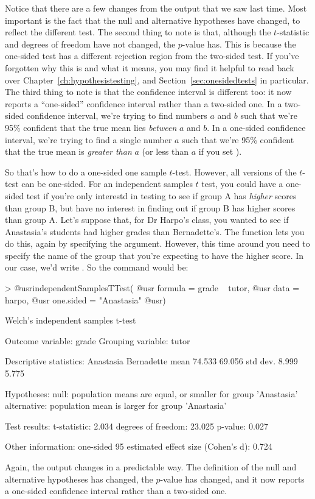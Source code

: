 Notice that there are a few changes from the output that we saw last time. Most important is the fact that the null and alternative hypotheses have changed, to reflect the different test. The second thing to note is that, although the $t$-statistic and degrees of freedom have not changed, the $p$-value has. This is because the one-sided test has a different rejection region from the two-sided test. If you've forgotten why this is and what it means, you may find it helpful to read back over Chapter~\ref{ch:hypothesistesting}, and Section~\ref{sec:onesidedtests} in particular. The third thing to note is that the confidence interval is different too: it now reports a ``one-sided'' confidence interval rather than a two-sided one. In a two-sided confidence interval, we're trying to find numbers $a$ and $b$ such that we're 95\% confident that the true mean lies {\it between} $a$ and $b$. In a one-sided confidence interval, we're trying to find a single number $a$ such that we're 95\% confident that the true mean is {\it greater than} $a$ (or less than $a$ if you set ).

So that's how to do a one-sided one sample $t$-test. However, all versions of the $t$-test can be one-sided. For an independent samples $t$ test, you could have a one-sided test if you're only interestd in testing to see if group A has {\it higher} scores than group B, but have no interest in finding out if group B has higher scores than group A. Let's suppose that, for Dr Harpo's class, you wanted to see if Anastasia's students had higher grades than Bernadette's. The  function lets you do this, again by specifying the  argument. However, this time around you need to specify the name of the group that you're expecting to have the higher score. In our case, we'd write . So the command would be:
\begin{rblock1}
> @usr{independentSamplesTTest( }
  @usr{  formula = grade ~ tutor,} 
  @usr{  data = harpo, }
  @usr{  one.sided = "Anastasia"}
  @usr{)}

   Welch's independent samples t-test 

Outcome variable:   grade 
Grouping variable:  tutor 

Descriptive statistics: 
            Anastasia Bernadette
   mean        74.533     69.056
   std dev.     8.999      5.775

Hypotheses: 
   null:        population means are equal, or smaller for group 'Anastasia' 
   alternative: population mean is larger for group 'Anastasia' 

Test results: 
   t-statistic:  2.034 
   degrees of freedom:  23.025 
   p-value:  0.027 

Other information: 
   one-sided 95%
   estimated effect size (Cohen's d):  0.724 
\end{rblock1}
Again, the output changes in a predictable way. The definition of the null and alternative hypotheses has changed, the $p$-value has changed, and it now reports a one-sided confidence interval rather than a two-sided one.

